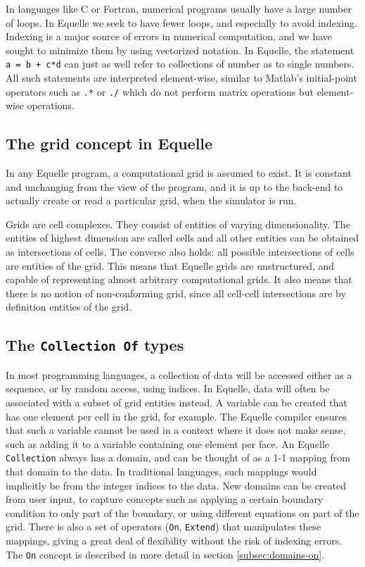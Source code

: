 \documentclass[11pt]{article}
\newcommand{\code}[1]{\texttt{#1}}
\begin{document}
In languages like C or Fortran, numerical programs usually have a large number of
loops. In Equelle we seek to have fewer loops, and especially to avoid indexing. Indexing
is a major source of errors in numerical computation, and we have sought to minimize them
by using vectorized notation. In Equelle, the statement \code{a = b + c*d} can just as
well refer to collections of number as to single numbers. All such statements are
interpreted element-wise, similar to Matlab's initial-point operators such as
\code{.*} or \code{./} which do not perform matrix operations but element-wise
operations.

\subsection{The grid concept in Equelle}

In any Equelle program, a computational grid is assumed to exist. It is constant and
unchanging from the view of the program, and it is up to the back-end to actually
create or read a particular grid, when the simulator is run.

Grids are cell complexes. They consist of entities of varying dimensionality. The entities
of highest dimension are called cells and all other entities can be obtained as
intersections of cells. The converse also holds: all possible intersections of cells are
entities of the grid. This means that Equelle grids are unstructured, and capable of
representing almost arbitrary computational grids. It also means that there is no notion
of non-conforming grid, since all cell-cell intersections are by definition entities of
the grid.

\subsection{The \code{Collection Of} types}

In most programming languages, a collection of data will be accessed either as a sequence,
or by random access, using indices. In Equelle, data will often be associated with a
subset of grid entities instead. A variable can be created that has one element per cell
in the grid, for example. The Equelle compiler ensures that such a variable cannot be used
in a context where it does not make sense, such as adding it to a variable containing one
element per face. An Equelle \code{Collection} always has a domain, and can be thought of
as a 1-1 mapping from that domain to the data. In traditional languages, such mappings
would implicitly be from the integer indices to the data. New domains can be created from
user input, to capture concepts such as applying a certain boundary condition to only part
of the boundary, or using different equations on part of the grid. There is also a set of
operators (\code{On}, \code{Extend}) that manipulates these mappings, giving a great deal
of flexibility without the risk of indexing errors. The \code{On} concept is described in more
detail in section \ref{subsec:domains-on}.
\end{document}
